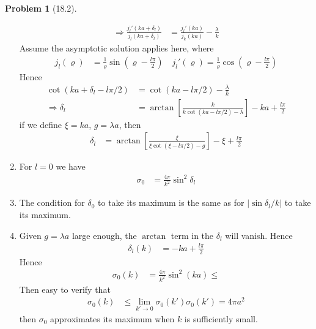 \documentclass[twoside,11pt]{article}
\theoremstyle{definition}
\newtheorem{problem}{Problem}
\theoremstyle{remark}
\begin{document}
\begin{problem}[18.2]
\begin{enumerate}[label=(\alph*)]
\begin{align*}
    \Rightarrow
    \frac{j_l'(ka+\delta_l)}{j_l(ka+\delta_l)} &= 
    \frac{j_l'(ka)}{j_k(ka)} - \frac{\lambda}{k}
\end{align*}
Assume the asymptotic solution applies here, where
\begin{align*}
    j_l(\varrho) &= \frac{1}{\varrho}\sin\left(\varrho - \frac{l\pi}{2}\right)\quad
    j_l'(\varrho) = \frac{1}{\varrho}\cos\left(\varrho - \frac{l\pi}{2}\right)
\end{align*}
Hence 
\begin{align*}
    \cot (ka+\delta_l-l\pi/2) &= 
    \cot (ka-l\pi/2) - \frac{\lambda}{k}\\
    \Rightarrow
    \delta_l &= \arctan\left[\frac{k}{k\cot (ka-l\pi/2) - \lambda}\right] 
    - ka + \frac{l\pi}{2}
\end{align*}
if we define $\xi=ka$, $g=\lambda a$, then
\begin{align*}
    \delta_l &= \arctan\left[\frac{\xi}{\xi\cot (\xi-l\pi/2) - g}\right] 
    - \xi + \frac{l\pi}{2}
\end{align*}

\item For $l=0$ we have
\begin{align*}
    \sigma_0 &= 
    \frac{4\pi}{k^2}\sin^2\delta_l
\end{align*}

\item The condition for $\delta_0$ to take its maximum is the same as
for $|\sin\delta_l/k|$ to take its maximum.

\item Given $g=\lambda a$ large enough, the $\arctan$ term in the
$\delta_l$ will vanish. Hence 
\begin{align*}
    \delta_l(k) &= -ka + \frac{l\pi}{2}
\end{align*}
Hence 
\begin{align*}
    \sigma_0(k) &= \frac{4\pi}{k^2}\sin^2(ka)\leq
\end{align*}
Then easy to verify that
\begin{align*}
    \sigma_0(k) &\leq \lim_{k'\rightarrow 0}\sigma_0(k')
    \sigma_0(k') = 4\pi a^2
\end{align*}
then $\sigma_0$ approximates its maximum when $k$ is sufficiently small.

\end{enumerate}
\end{problem}
\end{document}
